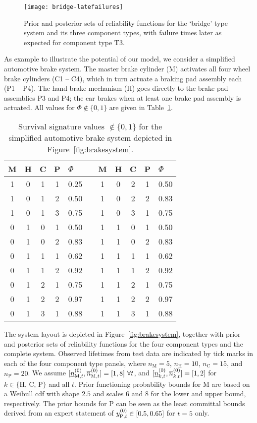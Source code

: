 \documentclass[12pt, a4paper]{elsarticle}
\begin{document}
\begin{figure}
\texttt{[image: bridge-latefailures]}
\caption{Prior and posterior sets of reliability functions for the `bridge' type system and its three component types,
with failure times later as expected for component type T3.}
\label{fig:bridge-late}
\end{figure}

As example to illustrate the potential of our model,
we consider a simplified automotive brake system.
The master brake cylinder (M) activates all four wheel brake cylinders (C1 -- C4),
which in turn actuate a braking pad assembly each (P1 -- P4).
The hand brake mechanism (H) goes directly to the brake pad assemblies P3 and P4;
the car brakes when at least one brake pad assembly is actuated.
All values for $\Phi \not\in \{0,1\}$ are given in Table~\ref{tab:brake-survsign}.
\begin{table}
\centering
\begin{tabular}{cccclcccccl}
  \toprule
M & H & C & P & $\Phi$ & \quad & M & H & C & P & $\Phi$\\ 
  \midrule
1 & 0 & 1 & 1 & 0.25 & & 1 & 0 & 2 & 1 & 0.50 \\ 
1 & 0 & 1 & 2 & 0.50 & & 1 & 0 & 2 & 2 & 0.83 \\ 
1 & 0 & 1 & 3 & 0.75 & & 1 & 0 & 3 & 1 & 0.75 \\ 
0 & 1 & 0 & 1 & 0.50 & & 1 & 1 & 0 & 1 & 0.50 \\ 
0 & 1 & 0 & 2 & 0.83 & & 1 & 1 & 0 & 2 & 0.83 \\ 
0 & 1 & 1 & 1 & 0.62 & & 1 & 1 & 1 & 1 & 0.62 \\ 
0 & 1 & 1 & 2 & 0.92 & & 1 & 1 & 1 & 2 & 0.92 \\ 
0 & 1 & 2 & 1 & 0.75 & & 1 & 1 & 2 & 1 & 0.75 \\ 
0 & 1 & 2 & 2 & 0.97 & & 1 & 1 & 2 & 2 & 0.97 \\ 
0 & 1 & 3 & 1 & 0.88 & & 1 & 1 & 3 & 1 & 0.88 \\ 
   \bottomrule
\end{tabular}
\caption{Survival signature values $\not\in \{0,1\}$ for the simplified automotive brake system depicted in Figure~\ref{fig:brakesystem}.
}
\label{tab:brake-survsign}
\end{table}
The system layout is depicted in Figure~\ref{fig:brakesystem},
together with prior and posterior sets of reliability functions for the four component types and the complete system.
Observed lifetimes from test data are indicated by tick marks in each of the four component type panels,
where $n_\text{M}=5$, $n_\text{H}=10$, $n_\text{C}=15$, and $n_\text{P}=20$.
We assume $[\underline{n}^{(0)}_{\text{M},t},\overline{n}^{(0)}_{\text{M},t}] = [1,8]\ \forall t$,
and $[\underline{n}^{(0)}_{k,t}, \overline{n}^{(0)}_{k,t}] = [1,2]$ for $k \in \{\text{H, C, P}\}$ and all $t$.
Prior functioning probability bounds for M are based on
a Weibull cdf with shape $2.5$ and scales $6$ and $8$ for the lower and upper bound, respectively.
The prior bounds for P can be seen as the least committal bounds
derived from an expert statement of $y^{(0)}_{\text{P},t} \in [0.5, 0.65]$ for $t=5$ only.
\end{document}
